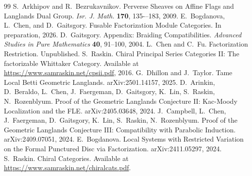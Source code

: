 \documentclass[10pt,a4paper]{amsart}
\begin{document}
\begin{thebibliography}{99}
 S.~Arkhipov and R.~Bezrukavnikov. Perverse Sheaves on Affine Flags and Langlands Dual Group. {\it Isr. J. Math.} {\bf 170}, 135-–183, 2009.
 E.~Bogdanova, L.~Chen, and D.~Gaitsgory. Fusable Factorization Module Categories. In preparation, 2026.
 D.~Gaitsgory. Appendix: Braiding Compatibilities. {\it Advanced Studies in Pure Mathematics} {\bf 40}, 91--100, 2004.
 L.~Chen and C.~Fu. Factorization Restriction. Unpublished.
 S.~Raskin. Chiral Principal Series Categories II: The factorizable Whittaker Category. Available at \url{https://www.samraskin.net/cpsii.pdf}, 2016.
 G.~Dhillon and J.~Taylor. Tame Local Betti Geometric Langlands. arXiv:2501.14157, 2025.
 D.~Arinkin, D.~Beraldo, L.~Chen, J.~Faergeman, D.~Gaitsgory, K.~Lin, S.~Raskin, N.~Rozenblyum. Proof of the Geometric Langlands Conjecture II: Kac-Moody Localization and the FLE. arXiv:2405.03648, 2024.
 J.~Campbell, L.~Chen, J.~Faergeman, D.~Gaitsgory, K.~Lin, S.~Raskin, N.~Rozenblyum. Proof of the Geometric Langlands Conjecture III: Compatibility with Parabolic Induction. arXiv:2409.07051, 2024.
 E.~Bogdanova. Local Systems with Restricted Variation on the Formal Punctured Disc via Factorization. arXiv:2411.05297, 2024.
 S.~Raskin. Chiral Categories. Available at \url{https://www.samraskin.net/chiralcats.pdf}.
\end{thebibliography}
\end{document}
